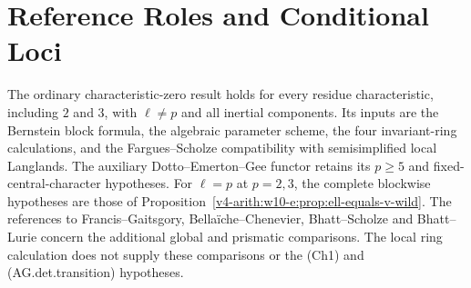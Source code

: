 \section{Reference Roles and Conditional Loci}
\label{v4-arith:w10-e:data}
\begin{remark}
\label{v4-arith:w10-e:rem:data}
The ordinary characteristic-zero result holds for every residue
characteristic, including $2$ and $3$, with $\ell\neq p$ and all
inertial components. Its inputs are the Bernstein block formula,
the algebraic parameter scheme, the four invariant-ring calculations,
and the Fargues--Scholze compatibility with semisimplified local
Langlands. The auxiliary Dotto--Emerton--Gee functor retains its
$p\geq5$ and fixed-central-character hypotheses. For $\ell=p$ at
$p=2,3$, the complete blockwise hypotheses are those of
Proposition~\ref{v4-arith:w10-e:prop:ell-equals-v-wild}.
The references to Francis--Gaitsgory, Bella\"iche--Chenevier,
Bhatt--Scholze and Bhatt--Lurie concern the additional global and
prismatic comparisons. The local ring calculation does not supply
these comparisons or the (Ch1) and (AG.det.transition) hypotheses.
\end{remark}

